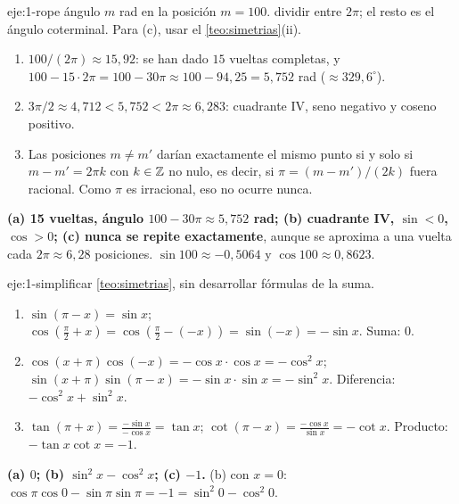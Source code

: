 \begin{solucion}{eje:1-rope}
\datos ángulo $m$ rad en la posición $m=100$.
\planteamiento dividir entre $2\pi$; el resto es el ángulo coterminal. Para (c), usar el \cref{teo:simetrias}(ii).
\pasos
\begin{enumerate}[label=\arabic*.]
  \item $100/(2\pi)\approx15{,}92$: se han dado $15$ vueltas completas, y $100-15\cdot2\pi=100-30\pi\approx100-94{,}25=5{,}752$ rad ($\approx329{,}6^{\circ}$).
  \item $3\pi/2\approx4{,}712<5{,}752<2\pi\approx6{,}283$: cuadrante IV, seno negativo y coseno positivo.
  \item Las posiciones $m\ne m'$ darían exactamente el mismo punto si y solo si $m-m'=2\pi k$ con $k\in\mathbb{Z}$ no nulo, es decir, si $\pi=(m-m')/(2k)$ fuera racional. Como $\pi$ es irracional, eso no ocurre nunca.
\end{enumerate}
\resultado \textbf{(a) 15 vueltas, ángulo $100-30\pi\approx5{,}752$ rad; (b) cuadrante IV, $\sin<0$, $\cos>0$; (c) nunca se repite exactamente}, aunque se aproxima a una vuelta cada $2\pi\approx6{,}28$ posiciones.
\comprobacion $\sin100\approx-0{,}5064$ y $\cos100\approx0{,}8623$.
\end{solucion}

\begin{solucion}{eje:1-simplificar}
\planteamiento \cref{teo:simetrias}, sin desarrollar fórmulas de la suma.
\pasos
\begin{enumerate}[label=(\alph*)]
  \item $\sin(\pi-x)=\sin x$; $\cos(\frac{\pi}{2}+x)=\cos(\frac{\pi}{2}-(-x))=\sin(-x)=-\sin x$. Suma: $0$.
  \item $\cos(x+\pi)\cos(-x)=-\cos x\cdot\cos x=-\cos^{2}x$; $\sin(x+\pi)\sin(\pi-x)=-\sin x\cdot\sin x=-\sin^{2}x$. Diferencia: $-\cos^{2}x+\sin^{2}x$.
  \item $\tan(\pi+x)=\frac{-\sin x}{-\cos x}=\tan x$; $\cot(\pi-x)=\frac{-\cos x}{\sin x}=-\cot x$. Producto: $-\tan x\cot x=-1$.
\end{enumerate}
\resultado \textbf{(a) $0$; (b) $\sin^{2}x-\cos^{2}x$; (c) $-1$.}
\comprobacion (b) con $x=0$: $\cos\pi\cos0-\sin\pi\sin\pi=-1=\sin^{2}0-\cos^{2}0$.
\end{solucion}

